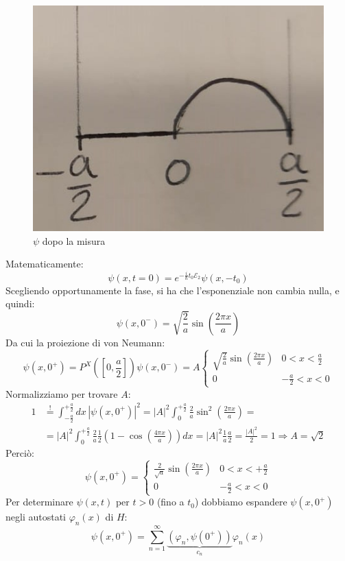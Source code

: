 \documentclass[../../FisicaTeorica.tex]{subfiles}
\begin{document}
\begin{enumerate}
\begin{figure}[H]
\centering
\includegraphics[scale=0.6]{Immagini/15_11/img3.jpeg}
\caption{$\psi$ dopo la misura}
\end{figure}
Matematicamente:
\[
\psi(x,t=0)=e^{-\frac{i}{\hbar}t_0\mathcal{E}_2} \psi(x,-t_0)
\]
Scegliendo opportunamente la fase, si ha che l'esponenziale non cambia nulla, e quindi:
\[
\psi(x,0^-)=\sqrt{\frac{2}{a}} \sin\left(\frac{2\pi x}{a}\right)
\]
Da cui la proiezione di von Neumann:
\[
\psi(x,0^+) = P^X\left(\left[0,\frac{a}{2}\right]\right)\psi(x,0^-)=A\begin{cases}
\sqrt{\frac{2}{a}}\sin\left(\frac{2\pi x}{a}\right) & 0 <x<\frac{a}{2}\\
0 & -\frac{a}{2}<x<0
\end{cases}
\]
Normalizziamo per trovare $A$:
\begin{align*}
1&\overset{!}{=}\int_{-\frac{a}{2}}^{+\frac{a}{2}} dx\,|\psi(x,0^+)|^2 = |A|^2 \int_0^{+\frac{a}{2}} \frac{2}{a}\sin^2\left(\frac{2\pi x}{a}\right)=\\
&=|A|^2 \int_0^{+\frac{a}{2}} \frac{2}{a}\frac{1}{2}\left(1-\cos\left(\frac{4\pi x}{a}\right)\right) dx = |A|^2 \frac{1}{a} \frac{a}{2} = \frac{|A|^2}{2}=1\Rightarrow A=\sqrt{2}
\end{align*}
Perciò:
\[
\psi(x,0^+)=\begin{cases}
\frac{2}{\sqrt{a}}\sin\left(\frac{2\pi x}{a}\right) & 0<x<+\frac{a}{2}\\
0 & -\frac{a}{2}<x<0
\end{cases}
\]
Per determinare $\psi(x,t)$ per $t>0$ (fino a $t_0$) dobbiamo espandere $\psi(x,0^+)$ negli autostati $\varphi_n(x)$ di $H$:
\[
\psi(x,0^+)=\sum_{n=1}^{\infty} \underbrace{(\varphi_n, \psi(0^+))}_{c_n}\varphi_n(x)
\]
\end{enumerate}
\end{document}
